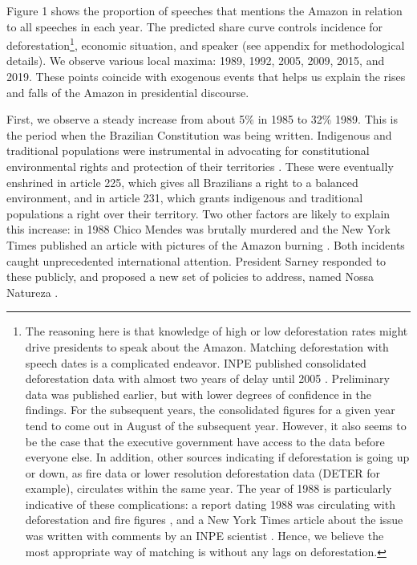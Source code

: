 \documentclass[]{interact}
\theoremstyle{plain}%
\theoremstyle{definition}
\theoremstyle{remark}
\begin{document}
Figure 1 shows the proportion of speeches that mentions the Amazon in
relation to all speeches in each year. The predicted share curve
controls incidence for deforestation\footnote{The reasoning here is that
  knowledge of high or low deforestation rates might drive presidents to
  speak about the Amazon. Matching deforestation with speech dates is a
  complicated endeavor. INPE published consolidated deforestation data
  with almost two years of delay until 2005
  \citep[pp.~60]{capobianco2021}. Preliminary data was published
  earlier, but with lower degrees of confidence in the findings. For the
  subsequent years, the consolidated figures for a given year tend to
  come out in August of the subsequent year. However, it also seems to
  be the case that the executive government have access to the data
  before everyone else. In addition, other sources indicating if
  deforestation is going up or down, as fire data or lower resolution
  deforestation data (DETER for example), circulates within the same
  year. The year of 1988 is particularly indicative of these
  complications: a report dating 1988 was circulating with deforestation
  and fire figures \citep{fearnside1990}, and a New York Times article
  about the issue was written with comments by an INPE scientist
  \citep{simons1988}. Hence, we believe the most appropriate way of
  matching is without any lags on deforestation.}, economic situation,
and speaker (see appendix for methodological details). We observe
various local maxima: 1989, 1992, 2005, 2009, 2015, and 2019. These
points coincide with exogenous events that helps us explain the rises
and falls of the Amazon in presidential discourse.

First, we observe a steady increase from about 5\% in 1985 to 32\% 1989.
This is the period when the Brazilian Constitution was being written.
Indigenous and traditional populations were instrumental in advocating
for constitutional environmental rights and protection of their
territories \citep{hecht1990}. These were eventually enshrined in
article 225, which gives all Brazilians a right to a balanced
environment, and in article 231, which grants indigenous and traditional
populations a right over their territory. Two other factors are likely
to explain this increase: in 1988 Chico Mendes was brutally murdered and
the New York Times published an article with pictures of the Amazon
burning \citep{simons1988}. Both incidents caught unprecedented
international attention. President Sarney responded to these publicly,
and proposed a new set of policies to address, named Nossa Natureza
\citep{capobianco2021}.
\end{document}
